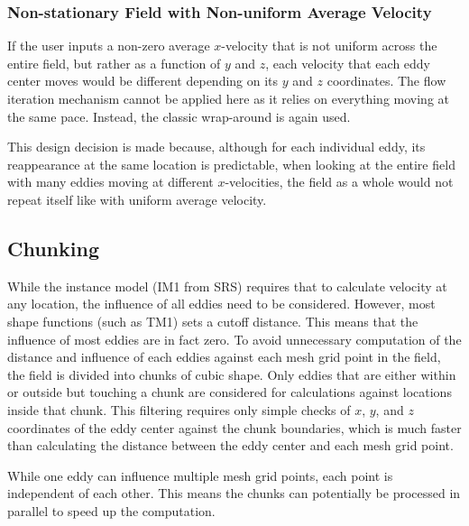 \documentclass[12pt, titlepage]{article}
\begin{document}
\subsubsection{Non-stationary Field with Non-uniform Average Velocity}
If the user inputs a non-zero average $x$-velocity that is not uniform across the entire field, but rather as a function of $y$ and $z$, each velocity that each eddy center moves would be different depending on its $y$ and $z$ coordinates. The flow iteration mechanism cannot be applied here as it relies on everything moving at the same pace. Instead, the classic wrap-around is again used.

This design decision is made because, although for each individual eddy, its reappearance at the same location is predictable, when looking at the entire field with many eddies moving at different $x$-velocities, the field as a whole would not repeat itself like with uniform average velocity.

\subsection{Chunking}

While the instance model (IM1 from SRS) requires that to calculate velocity at any location, the influence of all eddies need to be considered. However, most shape functions (such as TM1) sets a cutoff distance. This means that the influence of most eddies are in fact zero. To avoid unnecessary computation of the distance and influence of each eddies against each mesh grid point in the field, the field is divided into chunks of cubic shape. Only eddies that are either within or outside but touching a chunk are considered for calculations against locations inside that chunk. This filtering requires only simple checks of $x$, $y$, and $z$ coordinates of the eddy center against the chunk boundaries, which is much faster than calculating the distance between the eddy center and each mesh grid point.

While one eddy can influence multiple mesh grid points, each point is independent of each other. This means the chunks can potentially be processed in parallel to speed up the computation.

\end{document}
